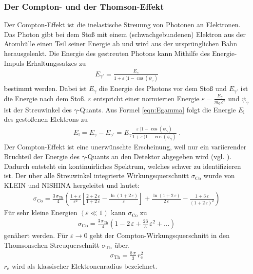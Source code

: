 \subsubsection{Der Compton- und der Thomson-Effekt}
Der Compton-Effekt ist die inelastische Streuung von Photonen an Elektronen. Das Photon gibt bei dem Stoß mit einem (schwachgebundenen) Elektron aus der Atomhülle einen Teil seiner Energie ab und wird aus der ursprünglichen Bahn herausgelenkt. Die Energie des gestreuten Photons kann Mithilfe des Energie-Impuls-Erhaltungssatzes zu
\begin{align}
	E_{\gamma'} = \frac{E_{\gamma}}{1 + \varepsilon\,(1-\cos(\psi_{\gamma})}
	\label{eqn:Egamma}
\end{align}
bestimmt werden. Dabei ist $E_{\gamma}$ die Energie des Photons vor dem Stoß und $E_{\gamma'}$ ist die Energie nach dem Stoß. $\varepsilon$ entspricht einer normierten Energie $\varepsilon = \frac{E_{\gamma}}{m_0\,c^2}$ und $\psi_{\gamma}$ ist der Streuwinkel des $\gamma$-Quants. Aus Formel \eqref{eqn:Egamma} folgt die Energie $E_\text{l}$ des gestoßenen Elektrons zu
\begin{align}
	E_\text{l} = E_{\gamma} - E_{\gamma'} = E_{\gamma} \frac{\varepsilon\,(1-\cos(\psi_{\gamma})}{1 + \varepsilon\,(1-\cos(\psi_{\gamma})} \ .
	\label{eqn:El}
\end{align}
Der Compton-Effekt ist eine unerwünschte Erscheinung, weil nur ein variierender Bruchteil der Energie des $\gamma$-Quants an den Detektor abgegeben wird (vgl. \cite[5]{V18}). Dadurch entsteht ein kontinuirliches Spektrum, welches schwer zu identifizieren ist. Der über alle Streuwinkel integrierte Wirkungsquerschnitt $\sigma_\text{Co}$ wurde von KLEIN und NISHINA hergeleitet und lautet:
\begin{align}
	\sigma_\text{Co} = \frac{3\,\sigma_\text{Th}}{4} \left( \frac{1+\varepsilon}{\varepsilon^2} \left[\frac{2+2\,\varepsilon}{1+2\,\varepsilon} - \frac{\ln(1+2\,\varepsilon)}{\varepsilon} \right] + \frac{\ln(1+2\,\varepsilon)}{2\,\varepsilon} - \frac{1+3\,\varepsilon}{(1+2\,\varepsilon)^2} \right)
\end{align}
Für sehr kleine Energien $(\varepsilon \ll 1)$ kann $\sigma_\text{Co}$ zu
\begin{align}
	\sigma_\text{Co} = \frac{3\,\sigma_\text{Th}}{4} \left(1 - 2\,\varepsilon + \frac{26}{5}\,\varepsilon^2 + \dots \right)
\end{align}
genähert werden. Für $\varepsilon \rightarrow 0$ geht der Compton-Wirkungsquerschnitt in den Thomsonschen Streuquerschnitt $\sigma_\text{Th}$ über.
\begin{align}
	\sigma_\text{Th} = \frac{8\,\pi}{3}\,r_\text{e}^2
\end{align}
$r_\text{e}$ wird als klassischer Elektronenradius bezeichnet.



